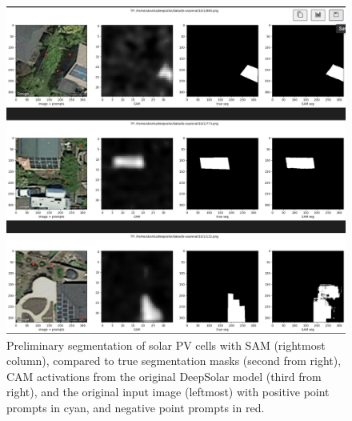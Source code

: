 \documentclass[10pt,twocolumn,letterpaper]{article}
\begin{document}
\begin{figure}[htp]
\centering
\includegraphics[width=15cm]{prelim_sam.png}
\caption{Preliminary segmentation of solar PV cells with SAM (rightmost column), compared to true segmentation masks (second from right), CAM activations from the original DeepSolar model (third from right), and the original input image (leftmost) with positive point prompts in cyan, and negative point prompts in red.}
\end{figure}


\newpage
{\small


}
\end{document}
